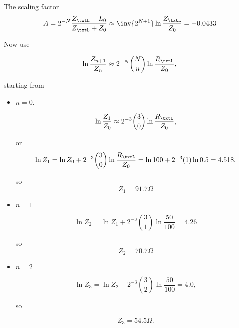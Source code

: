 The scaling factor
\begin{equation}\label{eqn:uwavesDeck7MultisectionTransformersCore:460}
A 
= 2^{-N} \frac{Z_\txtL - L_0}{Z_\txtL + Z_0} 
\approx
\inv{2^{N+1}} \ln \frac{Z_\txtL}{Z_0}
= -0.0433
\end{equation}

Now use

\begin{dmath}\label{eqn:uwavesDeck7MultisectionTransformersCore:940}
\ln \frac{Z_{n+1}}{Z_n}
\approx 2^{-N} \binom{N}{n} \ln \frac{R_\txtL}{Z_0},
\end{dmath}

starting from 

\begin{itemize}
\item \( n = 0 \).

\begin{equation}\label{eqn:uwavesDeck7MultisectionTransformersCore:480}
\ln \frac{Z_{1}}{Z_0} \approx 2^{-3} \binom{3}{0} \ln \frac{R_\txtL}{Z_0},
\end{equation}

or
\begin{dmath}\label{eqn:uwavesDeck7MultisectionTransformersCore:500}
\ln Z_{1} 
= \ln Z_0 + 2^{-3} \binom{3}{0} \ln \frac{R_\txtL}{Z_0}
= \ln 100 + 2^{-3} (1) \ln 0.5
= 4.518,
\end{dmath}

so
\begin{equation}\label{eqn:uwavesDeck7MultisectionTransformersCore:520}
Z_1 = 91.7 \Omega
\end{equation}

\item \( n = 1 \)

\begin{dmath}\label{eqn:uwavesDeck7MultisectionTransformersCore:540}
\ln Z_{2}
= \ln Z_1 + 2^{-3} \binom{3}{1} \ln \frac{50}{100} = 4.26
\end{dmath}

so
\begin{dmath}\label{eqn:uwavesDeck7MultisectionTransformersCore:560}
Z_2 = 70.7 \Omega
\end{dmath}

\item \( n = 2 \)

\begin{dmath}\label{eqn:uwavesDeck7MultisectionTransformersCore:580}
\ln Z_{3} = \ln Z_2 + 2^{-3} \binom{3}{2} \ln \frac{50}{100} = 4.0,
\end{dmath}

so

\begin{dmath}\label{eqn:uwavesDeck7MultisectionTransformersCore:600}
Z_3 = 54.5 \Omega.
\end{dmath}

\end{itemize}

